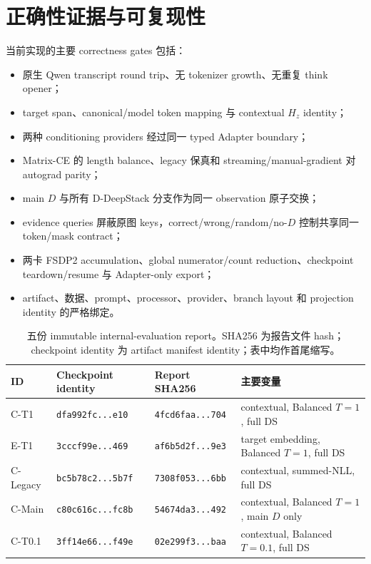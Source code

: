 \documentclass[UTF8,twocolumn,10pt,a4paper]{ctexart}
\newcommand{\code}[1]{\texttt{#1}}
\begin{document}
\section{正确性证据与可复现性}
当前实现的主要 correctness gates 包括：
\begin{itemize}
  \item 原生 Qwen transcript round trip、无 tokenizer growth、无重复 think opener；
  \item target span、canonical/model token mapping 与 contextual $H_z$ identity；
  \item 两种 conditioning providers 经过同一 typed Adapter boundary；
  \item Matrix-CE 的 length balance、legacy 保真和 streaming/manual-gradient 对 autograd parity；
  \item main $D$ 与所有 D-DeepStack 分支作为同一 observation 原子交换；
  \item evidence queries 屏蔽原图 keys，correct/wrong/random/no-$D$ 控制共享同一 token/mask contract；
  \item 两卡 FSDP2 accumulation、global numerator/count reduction、checkpoint teardown/resume 与 Adapter-only export；
  \item artifact、数据、prompt、processor、provider、branch layout 和 projection identity 的严格绑定。
\end{itemize}

\begin{table}[!t]
\centering
\caption{五份 immutable internal-evaluation report。SHA256 为报告文件 hash；checkpoint identity 为 artifact manifest identity；表中均作首尾缩写。}
\label{tab:artifacts}
\scriptsize
\setlength{\tabcolsep}{2pt}
\begin{tabularx}{\columnwidth}{l l l Y}
\toprule
ID & Checkpoint identity & Report SHA256 & 主要变量 \\
\midrule
C-T1 & \code{dfa992fc...e10} & \code{4fcd6faa...704} & contextual, Balanced $T=1$, full DS \\
E-T1 & \code{3cccf99e...469} & \code{af6b5d2f...9e3} & target embedding, Balanced $T=1$, full DS \\
C-Legacy & \code{bc5b78c2...5b7f} & \code{7308f053...6bb} & contextual, summed-NLL, full DS \\
C-Main & \code{c80c616c...fc8b} & \code{54674da3...492} & contextual, Balanced $T=1$, main $D$ only \\
C-T0.1 & \code{3ff14e66...f49e} & \code{02e299f3...baa} & contextual, Balanced $T=0.1$, full DS \\
\bottomrule
\end{tabularx}
\end{table}
\end{document}

